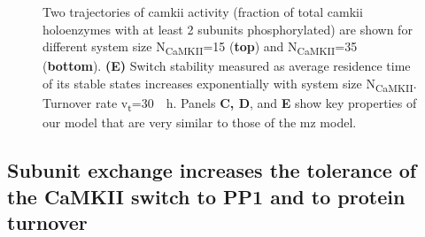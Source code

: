 \documentclass[9pt,lineno]{elife}
\newcommand\SUB[2]{#1\textsubscript{#2}}
\begin{document}
\begin{figure}[t]
{        Two trajectories of \gls{camkii} activity (fraction of total \gls{camkii}
        holoenzymes with at least 2 subunits phosphorylated) are shown for different system
        size \SUB{N}{CaMKII}=15 (\textbf{top}) and \SUB{N}{CaMKII}=35 (\textbf{bottom}).
        \textbf{(E)} Switch stability measured as average residence time of
        its stable states increases exponentially with system size \SUB{N}{CaMKII}.
        Turnover rate \SUB{v}{t}=\SI{30}{\per \hour}. Panels \textbf{C, D}, and
        \textbf{E} show key properties of our model that are very similar to those of the \gls{mz} 
        model.}\label{fig:validation} 
\end{figure}


\subsection{Subunit exchange increases the tolerance of the CaMKII switch to PP1 
and to protein turnover}\label{subsec:result_tolerance}
\end{document}
